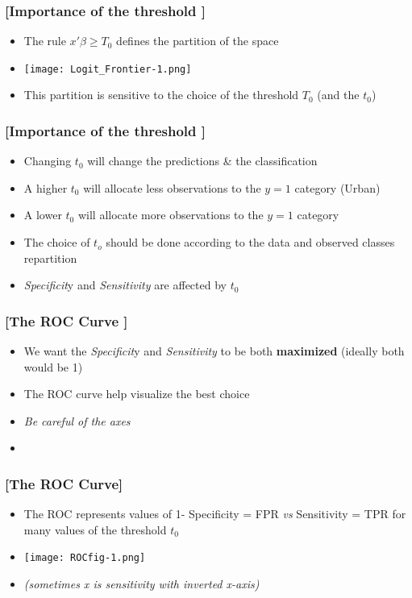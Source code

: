 \documentclass[xcolor=x11names,compress, handhouts]{beamer}
\renewcommand{\(}{\begin{columns}}
\renewcommand{\)}{\end{columns}}
\newcommand{\<}[1]{\begin{column}{#1}}
\renewcommand{\>}{\end{column}}
\begin{document}
\begin{frame} %
\frametitle{\textcolor{brique}{[Importance of the threshold ]}}
\pause
 \begin{itemize}[<+->]
  \item The rule $ x'\beta \geq T_0$ defines the partition of the space
  \item[] \begin{center}\texttt{[image: Logit\_Frontier-1.png]} \end{center}
  \item This partition is sensitive to the choice of the threshold $T_0$ (and the $t_0$)
\end{itemize}
\end{frame}


\begin{frame} %
\frametitle{\textcolor{brique}{[Importance of the threshold ]}}
\pause
 \begin{itemize}[<+->]
  \item Changing $t_0$ will  change the predictions \&  the classification
  \item[] A higher $t_0$ will allocate less observations to the $y=1$ category (Urban)
  \item[] A lower $t_0$ will allocate more observations to the $y=1$ category
  \item The choice of $t_o$ should be done according to the data and observed classes repartition
  \item \textit{Specificit}y and \textit{Sensitivity} are affected by $t_0$
\end{itemize}
\end{frame}


\begin{frame} %
\frametitle{\textcolor{brique}{[The ROC Curve ]}}
\pause
 \begin{itemize}[<+->]
  \item We want the \textit{Specificit}y and \textit{Sensitivity} to be both \textbf{maximized} (ideally both would be 1)
  \item The ROC curve help visualize the best choice
  \item[] \textit{Be careful of the axes }
  \item
\end{itemize}
\end{frame}


\begin{frame} %
\frametitle{\textcolor{brique}{[The ROC Curve]}}
\pause
 \begin{itemize}[<+->]
  \item[] The ROC represents values of 1- Specificity =  FPR  \textit{vs} Sensitivity =  TPR for many values of the threshold $t_0$
  \item[] \begin{center}\texttt{[image: ROCfig-1.png]} \end{center}
  \item \textit{(sometimes  x is sensitivity  with inverted x-axis)}
\end{itemize}
\end{frame}
\end{document}
